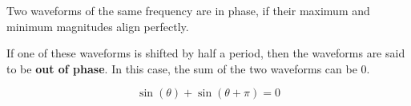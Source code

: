 \documentclass{ximera}
\begin{document}
Two waveforms of the same frequency are in phase, if their maximum and minimum magnitudes align perfectly.

If one of these waveforms is shifted by half a period, then the waveforms are said to be \textbf{out of phase}. In this case, the sum of the two waveforms can be $0$.




\begin{center}
\end{center}






\[
\sin(\theta) + \sin(\theta + \pi) = 0
\]
\end{document}
